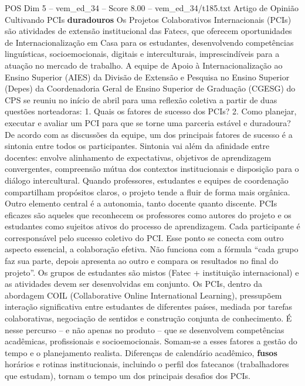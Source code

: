 \begin{textsample}{POS Dim 5 – vem\_ed\_34 – Score 8.00 – vem\_ed\_34/t185.txt}  \label{ex:f5_pos_002}
Artigo de Opinião Cultivando PCIs \textbf{duradouros} Os Projetos Colaborativos Internacionais (PCIs) são atividades de extensão institucional das Fatecs, que oferecem oportunidades de Internacionalização em Casa para os estudantes, desenvolvendo competências linguísticas, socioemocionais, digitais e interculturais, imprescindíveis para a atuação no mercado de trabalho.
A equipe de Apoio à Internacionalização ao Ensino Superior (AIES) da Divisão de Extensão e Pesquisa no Ensino Superior (Depes) da Coordenadoria Geral de Ensino Superior de Graduação (CGESG) do CPS se reuniu no início de abril para uma reflexão coletiva a partir de duas questões norteadoras: 1.
Quais os fatores de sucesso dos PCIs? 2.
Como planejar, executar e avaliar um PCI para que se torne uma parceria estável e duradoura?
De acordo com as discussões da equipe, um dos principais fatores de sucesso é a sintonia entre todos os participantes.
Sintonia vai além da afinidade entre docentes: envolve alinhamento de expectativas, objetivos de aprendizagem convergentes, compreensão mútua dos contextos institucionais e disposição para o diálogo intercultural.
Quando professores, estudantes e equipes de coordenação compartilham propósitos claros, o projeto tende a fluir de forma mais orgânica.
Outro elemento central é a autonomia, tanto docente quanto discente.
PCIs eficazes são aqueles que reconhecem os professores como autores do projeto e os estudantes como sujeitos ativos do processo de aprendizagem.
Cada participante é corresponsável pelo sucesso coletivo do PCI.
Esse ponto se conecta com outro aspecto essencial, a colaboração efetiva.
Não funciona com a fórmula “cada grupo faz sua parte, depois apresenta ao outro e compara os resultados no final do projeto”.
Os grupos de estudantes são mistos (Fatec + instituição internacional) e as atividades devem ser desenvolvidas em conjunto.
Os PCIs, dentro da abordagem COIL (Collaborative Online International Learning), pressupõem interação significativa entre estudantes de diferentes países, mediada por tarefas colaborativas, negociação de sentidos e construção conjunta de conhecimento.
É nesse percurso – e não apenas no produto – que se desenvolvem competências acadêmicas, profissionais e socioemocionais.
Somam-se a esses fatores a gestão do tempo e o planejamento realista.
Diferenças de calendário acadêmico, \textbf{fusos} horários e rotinas institucionais, incluindo o perfil dos fatecanos (trabalhadores que estudam), tornam o tempo um dos principais desafios dos PCIs.

\end{textsample}
